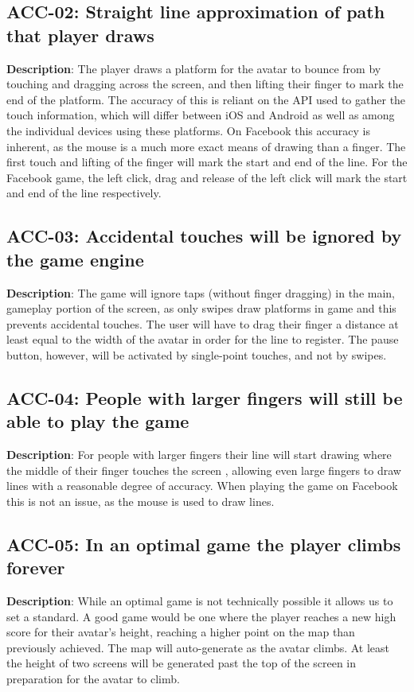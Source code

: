 \subsection{ACC-02: Straight line approximation of path that player draws}
\textbf{Description}: The player draws a platform for the avatar to bounce
from by touching and dragging across the screen, and then lifting
their finger to mark the end of the platform. The accuracy of this
is reliant on the API used to gather the touch information, which
will differ between iOS and Android as well as among the individual
devices using these platforms. On Facebook this accuracy is inherent,
as the mouse is a much more exact means of drawing than a finger.
The first touch and lifting of the finger will mark the start and
end of the line. For the Facebook game, the left click, drag and release
of the left click will mark the start and end of the line respectively.

\subsection{ACC-03: Accidental touches will be ignored by the game engine}
\textbf{Description}: The game will ignore taps (without finger dragging) in
the main, gameplay portion of the screen, as only swipes draw platforms
in game and this prevents accidental touches. The user will have to
drag their finger a distance at least equal to the width of the avatar
in order for the line to register. The pause button, however, will
be activated by single-point touches, and not by swipes.

\subsection{ACC-04: People with larger fingers will still be able to play the game}
\textbf{Description}: For people with larger fingers their line will start
drawing where the middle of their finger touches the screen , allowing
even large fingers to draw lines with a reasonable degree of accuracy.
When playing the game on Facebook this is not an issue, as the mouse
is used to draw lines. 

\subsection{ACC-05: In an optimal game the player climbs forever}
\textbf{Description}: While an optimal game is not technically possible it
allows us to set a standard. A good game would be one where the player
reaches a new high score for their avatar\textquoteright{}s height,
reaching a higher point on the map than previously achieved. The map
will auto-generate as the avatar climbs. At least the height of two
screens will be generated past the top of the screen in preparation
for the avatar to climb.


